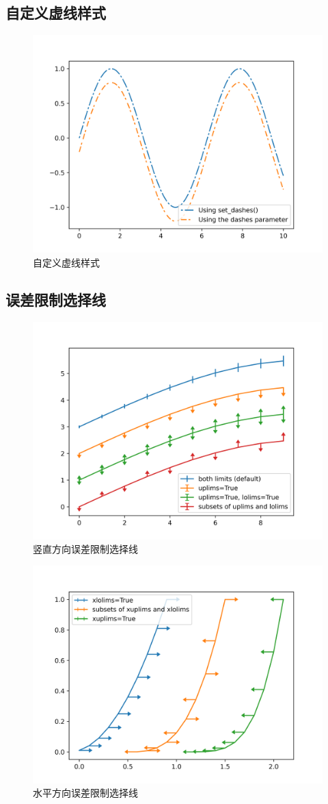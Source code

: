 \documentclass[openany]{progbookcn}
\begin{document}
\subsection{自定义虚线样式}

\begin{figure}[H]
\centering
\includegraphics[width=0.6 \textwidth]{figs/chapter24/lines/CustomizeLineStyle}
\caption{自定义虚线样式}
\end{figure}
\subsection{误差限制选择线}

\begin{figure}[H]
\centering
\includegraphics[width=0.6 \textwidth]{figs/chapter24/lines/UpLowErrorBar}
\caption{竖直方向误差限制选择线}
\end{figure}

\begin{figure}[H]
\centering
\includegraphics[width=0.6 \textwidth]{figs/chapter24/lines/XYErrorBar}
\caption{水平方向误差限制选择线}
\end{figure}
\end{document}
